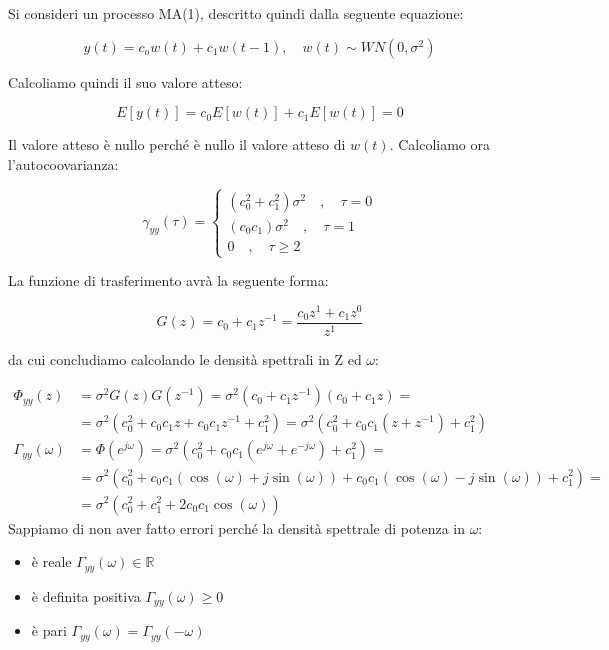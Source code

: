 \begin{esempio}
Si consideri un processo MA(1), descritto quindi dalla seguente equazione:

  \[ y(t)=c_ow(t)+c_1w(t-1),\quad w(t) \sim WN(0,\sigma^2) \]
  
\noindent Calcoliamo quindi il suo valore atteso: 

  \[ E[y(t)]=c_0E[w(t)]+c_1E[w(t)]=0 \]
  
\noindent Il valore atteso è nullo perché è nullo il valore atteso di $w(t)$. Calcoliamo ora l'autocoovarianza:

  \[ 
       \gamma_{yy}(\tau)=
      \left\lbrace
      \begin{split}
         (c_0^2+c_1^2)\sigma^2 \quad,\quad \tau=0 \\
         (c_0c_1)\sigma^2 \quad,\quad \tau=1\\
         0 \quad,\quad \tau \geq 2
      \end{split}\right.
   \]

\noindent La funzione di trasferimento avrà la seguente forma:

  \[ G(z)=c_0+c_1z^{-1}=\frac{c_0z^1+c_1z^0}{z^1} \]

\noindent da cui concludiamo calcolando le densità spettrali in Z ed $\omega$:

  \[ 
    \begin{split}
    \Phi_{yy}(z)&=\sigma^2 G(z)G(z^{-1})=\sigma^2 (c_0+c_1z^{-1})(c_0+c_1z)=\\
    &=\sigma^2 (c_0^2+c_0c_1z+c_0c_1z^{-1}+c_1^2)=\sigma^2 (c_0^2+c_0c_1(z+z^{-1})+c_1^2)\\
    \Gamma_{yy}(\omega)&=\Phi(e^{j\omega})=\sigma^2 (c_0^2+c_0c_1(e^{j\omega}+e^{-j\omega})+c_1^2)=\\
    &=\sigma^2 (c_0^2+c_0c_1(\cos(\omega)+j\sin(\omega))+c_0c_1(\cos(\omega)-j\sin(\omega))+c_1^2)=\\
    &=\sigma^2 (c_0^2+c_1^2+2c_0c_1\cos(\omega))
    \end{split}
  \]
Sappiamo di non aver fatto errori perché la densità spettrale di potenza in $\omega$:
\begin{itemize}
   \item è reale $\Gamma_{yy}(\omega)\in \mathbb{R}$
   \item è definita positiva $\Gamma_{yy}(\omega) \geq 0$
   \item è pari $\Gamma_{yy}(\omega) =\Gamma_{yy}(-\omega)$
 \end{itemize}
$\quad$
\end{esempio}
